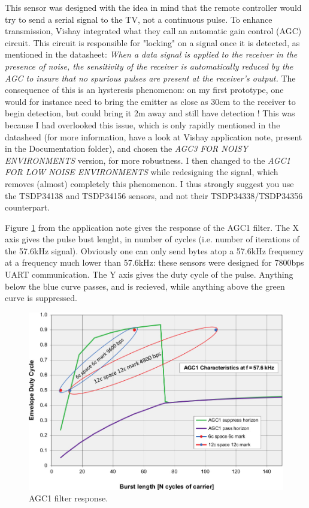 \documentclass[a4paper,11pt]{article}
\begin{document}
This sensor was designed with the idea in mind that the remote controller would try to send a serial signal to the TV, not a continuous pulse. To enhance transmission, Vishay integrated what they call an automatic gain control (AGC) circuit. This circuit is responsible for "locking" on a signal once it is detected, as mentioned in the datasheet: \emph{When a data signal is applied to the receiver in the presence of noise, the sensitivity of the receiver is automatically reduced by the AGC to insure that no spurious pulses are present at the receiver’s output.} The consequence of this is an hysteresis phenomenon: on my first prototype, one would for instance need to bring the emitter as close as 30cm to the receiver to begin detection, but could bring it 2m away and still have detection ! This was because I had overlooked this issue, which is only rapidly mentioned in the datasheed (for more information, have a look at Vishay application note, present in the Documentation folder), and chosen the \emph{AGC3 FOR NOISY ENVIRONMENTS} version, for more robustness. I then changed to the \emph{AGC1 FOR LOW NOISE ENVIRONMENTS} while redesigning the signal, which removes (almost) completely this phenomenon.  I thus strongly suggest you use the TSDP34138 and TSDP34156 sensors, and not their TSDP34338/TSDP34356 counterpart.

Figure \ref{fVishayApplication} from the application note gives the response of the AGC1 filter. The X axis gives the pulse bust lenght, in number of cycles (i.e. number of iterations of the 57.6kHz signal). Obviously one can only send bytes atop a 57.6kHz frequency at a frequency much lower than 57.6kHz: these sensors were designed for 7800bps UART communication. The Y axis gives the duty cycle of the pulse. Anything below the blue curve passes, and is recieved, while anything above the green curve is suppressed.

\begin{figure}[h]
  \centering
  \includegraphics[width=\textwidth]{Figures/AGC1.jpg}
  \caption{AGC1 filter response.}
  \label{fVishayApplication}
\end{figure}
\end{document}

